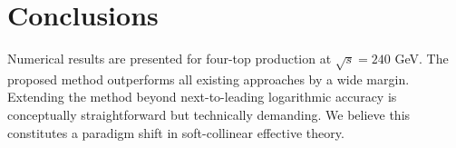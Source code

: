 \section{Conclusions}\label{sec:conclusions}

Numerical results are presented for four-top production at $\sqrt{s} =
240$ GeV. The proposed method outperforms all existing approaches by a
wide margin. Extending the method beyond next-to-leading logarithmic
accuracy is conceptually straightforward but technically demanding. We
believe this constitutes a paradigm shift in soft-collinear effective
theory.

